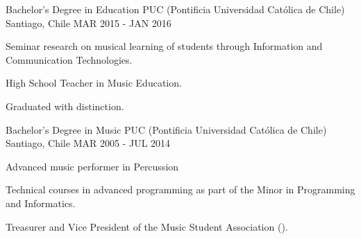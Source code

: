 

\begin{cventries}

  \cventry
    {Bachelor's Degree in Education} %
    {PUC (Pontificia Universidad Católica de Chile)} %
    {Santiago, Chile} %
    {MAR 2015 - JAN 2016} %
    {
      \begin{cvitems} %
        \item {Seminar research on musical learning of students through Information and Communication Technologies.}
        \item {High School Teacher in Music Education.}
        \item {Graduated with distinction.}
      \end{cvitems}
    }

  \cventry
    {Bachelor's Degree in Music} %
    {PUC (Pontificia Universidad Católica de Chile)} %
    {Santiago, Chile} %
    {MAR 2005 - JUL 2014} %
    {
	    \begin{cvitems} %
	     	\item {Advanced music performer in Percussion}
	     	\item {Technical courses in advanced programming as part of the Minor in Programming and Informatics.}
	     	\item {Treasurer and Vice President of the Music Student Association ().}
	    \end{cvitems}
    }

\end{cventries}

